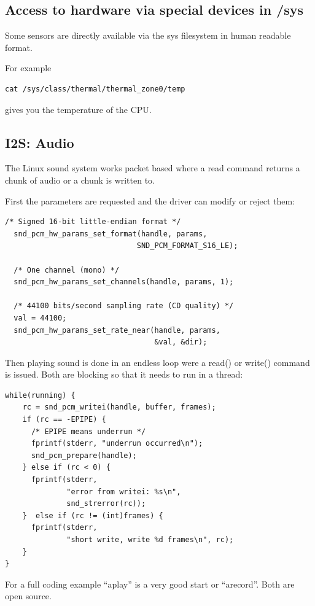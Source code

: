 \documentclass[12pt]{report}
\begin{document}
\subsection{Access to hardware via special devices in /sys}
Some sensors are directly available via the sys filesystem in human readable format.

For example
\begin{verbatim}
cat /sys/class/thermal/thermal_zone0/temp
\end{verbatim}
gives you the temperature of the CPU.




\subsection{I2S: Audio}
The Linux sound system works packet based where a read command
returns a chunk of audio or a chunk is written to.

First the parameters are requested and the driver can modify or
reject them:
\begin{verbatim}
/* Signed 16-bit little-endian format */
  snd_pcm_hw_params_set_format(handle, params,
                              SND_PCM_FORMAT_S16_LE);

  /* One channel (mono) */
  snd_pcm_hw_params_set_channels(handle, params, 1);

  /* 44100 bits/second sampling rate (CD quality) */
  val = 44100;
  snd_pcm_hw_params_set_rate_near(handle, params,
                                  &val, &dir);
\end{verbatim}

Then playing sound is done in an endless loop were a read()
or write() command is issued. Both are blocking so that
it needs to run in a thread:

\begin{verbatim}
while(running) {
    rc = snd_pcm_writei(handle, buffer, frames);
    if (rc == -EPIPE) {
      /* EPIPE means underrun */
      fprintf(stderr, "underrun occurred\n");
      snd_pcm_prepare(handle);
    } else if (rc < 0) {
      fprintf(stderr,
              "error from writei: %s\n",
              snd_strerror(rc));
    }  else if (rc != (int)frames) {
      fprintf(stderr,
              "short write, write %d frames\n", rc);
    }
}
\end{verbatim}

For a full coding example ``aplay'' is a very
good start or ``arecord''. Both are open source.
\end{document}
